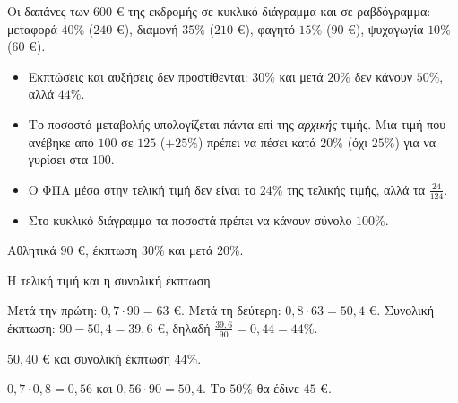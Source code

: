 \begin{center}
\end{center}

Οι δαπάνες των $600$ € της εκδρομής σε κυκλικό διάγραμμα και σε ραβδόγραμμα: μεταφορά $40\%$ ($240$ €), διαμονή $35\%$ ($210$ €), φαγητό $15\%$ ($90$ €), ψυχαγωγία $10\%$ ($60$ €).

\begin{prosoxi}
\begin{itemize}[leftmargin=1.2em,itemsep=0.3ex,topsep=2pt]
\item Εκπτώσεις και αυξήσεις δεν προστίθενται: $30\%$ και μετά $20\%$ δεν κάνουν $50\%$, αλλά $44\%$.
\item Το ποσοστό μεταβολής υπολογίζεται πάντα επί της \emph{αρχικής} τιμής. Μια τιμή που ανέβηκε από $100$ σε $125$ ($+25\%$) πρέπει να πέσει κατά $20\%$ (όχι $25\%$) για να γυρίσει στα $100$.
\item Ο ΦΠΑ μέσα στην τελική τιμή δεν είναι το $24\%$ της τελικής τιμής, αλλά τα $\frac{24}{124}$.
\item Στο κυκλικό διάγραμμα τα ποσοστά πρέπει να κάνουν σύνολο $100\%$.
\end{itemize}
\end{prosoxi}


\tixero Αθλητικά $90$ €, έκπτωση $30\%$ και μετά $20\%$.\par
\tithelo Η τελική τιμή και η συνολική έκπτωση.\par
\possindeo Μετά την πρώτη: $0{,}7\cdot90=63$ €. Μετά τη δεύτερη: $0{,}8\cdot63=50{,}4$ €. Συνολική έκπτωση: $90-50{,}4=39{,}6$ €, δηλαδή $\frac{39{,}6}{90}=0{,}44=44\%$.\par
\apantisi $50{,}40$ € και συνολική έκπτωση $44\%$.\par
\elegxos $0{,}7\cdot0{,}8=0{,}56$ και $0{,}56\cdot90=50{,}4$. Το $50\%$ θα έδινε $45$ €.

